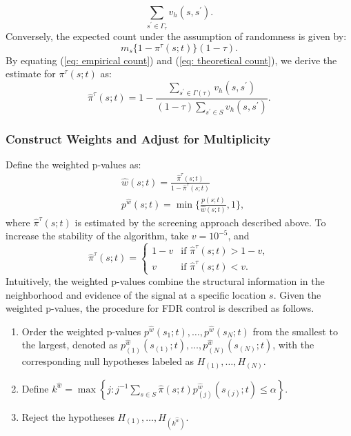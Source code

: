 \documentclass[11pt]{article}
\begin{document}
 \begin{equation}\label{eq: empirical count}
 	\sum_{s^{\prime}\in \Gamma_{\tau}}v_h(s,s^{\prime}).
 \end{equation}
 Conversely, the expected count under the assumption of randomness is given by:
 \begin{equation}\label{eq: theoretical count}
 	m_s\{1-\pi^{\tau}(s;t)\}(1-\tau).
 \end{equation}
By equating (\ref{eq: empirical count}) and (\ref{eq: theoretical count}), we derive the estimate for $\pi^{\tau}(s;t)$ as:
\begin{equation}
	\hat{\pi}^{\tau}(s;t)=1-\frac{\sum_{s^{\prime}\in \Gamma(\tau)}v_h(s,s^{\prime})}{(1-\tau)\sum_{s^{\prime}\in S}v_h(s,s^{\prime})}.
\end{equation}

 
 
 

\subsubsection*{Construct Weights and Adjust for Multiplicity}

Define the weighted p-values as:
\begin{align}
	&\hat{w}(s;t)=\frac{\hat{\pi}^{\tau}(s;t)}{1-\hat{\pi}^{\tau}(s;t)}\\
	&p^{\hat{w}}(s;t)=\min\big\{\frac{p(s;t)}{\hat{w}(s;t)},1\big\},
\end{align}
where $\hat{\pi}^{\tau}(s;t)$ is estimated by the screening approach described above. To increase the stability of the algorithm, take  $v=10^{-5}$, and 
\begin{equation}
	\hat{\pi}^{\tau}(s;t) = 
\begin{cases} 
1-v & \text{if } \hat{\pi}^{\tau}(s;t)>1-v, \\
v & \text{if } \hat{\pi}^{\tau}(s;t) < v.
\end{cases}
\end{equation}
Intuitively, the weighted p-values combine the structural information in the neighborhood and evidence of the signal at a specific location $s$. Given the weighted p-values,
the procedure for FDR control is described as follows.

\begin{enumerate}
    \item Order the weighted p-values $p^{\hat{w}}(s_1;t), \ldots, p^{\hat{w}}(s_N;t)$ from the smallest to the largest, denoted as $p_{(1)}^{\hat{w}}(s_{(1)};t), \ldots, p_{(N)}^{\hat{w}}(s_{(N)};t)$, with the corresponding null hypotheses labeled as $H_{(1)}, \ldots, H_{(N)}$. 
    \item Define $k^{\hat{w}} = \max\left\{j : j^{-1}\sum_{s \in S} \hat{\pi}(s;t)p_{(j)}^{\hat{w}}(s_{(j)};t) \leq \alpha\right\}$.
    \item Reject the hypotheses $H_{(1)}, \ldots, H_{(k^{\hat{w}})}$.  
\end{enumerate}	
\end{document}
